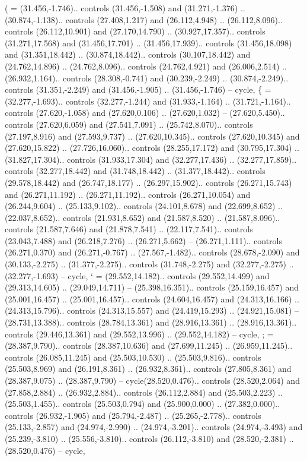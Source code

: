 {(} = {(31.456,-1.746).. controls (31.456,-1.508) and (31.271,-1.376) .. (30.874,-1.138).. controls (27.408,1.217) and (26.112,4.948) .. (26.112,8.096).. controls (26.112,10.901) and (27.170,14.790) .. (30.927,17.357).. controls (31.271,17.568) and (31.456,17.701) .. (31.456,17.939).. controls (31.456,18.098) and (31.351,18.442) .. (30.874,18.442).. controls (30.107,18.442) and (24.762,14.896) .. (24.762,8.096).. controls (24.762,4.921) and (26.006,2.514) .. (26.932,1.164).. controls (28.308,-0.741) and (30.239,-2.249) .. (30.874,-2.249).. controls (31.351,-2.249) and (31.456,-1.905) .. (31.456,-1.746) -- cycle},
{\{} = {(32.277,-1.693).. controls (32.277,-1.244) and (31.933,-1.164) .. (31.721,-1.164).. controls (27.620,-1.058) and (27.620,0.106) .. (27.620,1.032) -- (27.620,5.450).. controls (27.620,6.059) and (27.541,7.091) .. (25.742,8.070).. controls (27.197,8.916) and (27.593,9.737) .. (27.620,10.345).. controls (27.620,10.345) and (27.620,15.822) .. (27.726,16.060).. controls (28.255,17.172) and (30.795,17.304) .. (31.827,17.304).. controls (31.933,17.304) and (32.277,17.436) .. (32.277,17.859).. controls (32.277,18.442) and (31.748,18.442) .. (31.377,18.442).. controls (29.578,18.442) and (26.747,18.177) .. (26.297,15.902).. controls (26.271,15.743) and (26.271,11.192) .. (26.271,11.192).. controls (26.271,10.054) and (26.244,9.604) .. (25.133,9.102).. controls (24.101,8.678) and (22.699,8.652) .. (22.037,8.652).. controls (21.931,8.652) and (21.587,8.520) .. (21.587,8.096).. controls (21.587,7.646) and (21.878,7.541) .. (22.117,7.541).. controls (23.043,7.488) and (26.218,7.276) .. (26.271,5.662) -- (26.271,1.111).. controls (26.271,0.370) and (26.271,-0.767) .. (27.567,-1.482).. controls (28.678,-2.090) and (30.133,-2.275) .. (31.377,-2.275).. controls (31.748,-2.275) and (32.277,-2.275) .. (32.277,-1.693) -- cycle},
{`} = {(29.552,14.182).. controls (29.552,14.499) and (29.313,14.605) .. (29.049,14.711) -- (25.398,16.351).. controls (25.159,16.457) and (25.001,16.457) .. (25.001,16.457).. controls (24.604,16.457) and (24.313,16.166) .. (24.313,15.796).. controls (24.313,15.557) and (24.419,15.293) .. (24.921,15.081) -- (28.731,13.388).. controls (28.784,13.361) and (28.916,13.361) .. (28.916,13.361).. controls (29.446,13.361) and (29.552,13.996) .. (29.552,14.182) -- cycle},
{;} = {(28.387,9.790).. controls (28.387,10.636) and (27.699,11.245) .. (26.959,11.245).. controls (26.085,11.245) and (25.503,10.530) .. (25.503,9.816).. controls (25.503,8.969) and (26.191,8.361) .. (26.932,8.361).. controls (27.805,8.361) and (28.387,9.075) .. (28.387,9.790) -- cycle(28.520,0.476).. controls (28.520,2.064) and (27.858,2.884) .. (26.932,2.884).. controls (26.112,2.884) and (25.503,2.223) .. (25.503,1.455).. controls (25.503,0.794) and (25.900,0.000) .. (27.382,0.000).. controls (26.932,-1.905) and (25.794,-2.487) .. (25.265,-2.778).. controls (25.133,-2.857) and (24.974,-2.990) .. (24.974,-3.201).. controls (24.974,-3.493) and (25.239,-3.810) .. (25.556,-3.810).. controls (26.112,-3.810) and (28.520,-2.381) .. (28.520,0.476) -- cycle},
